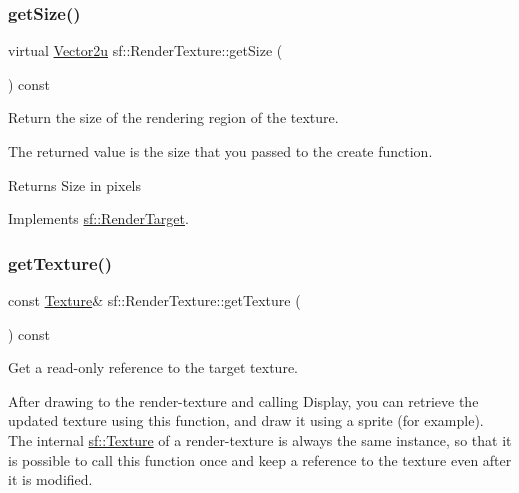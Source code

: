 \subsubsection{\texorpdfstring{getSize()}{getSize()}}
{\footnotesize\ttfamily virtual \mbox{\hyperlink{classsf_1_1_vector2}{Vector2u}} sf\+::\+Render\+Texture\+::get\+Size (\begin{DoxyParamCaption}{ }\end{DoxyParamCaption}) const\hspace{0.3cm}{\ttfamily [virtual]}}



Return the size of the rendering region of the texture. 

The returned value is the size that you passed to the create function.

\begin{DoxyReturn}{Returns}
Size in pixels \begin{DoxyVerb}\end{DoxyVerb}
 
\end{DoxyReturn}


Implements \mbox{\hyperlink{classsf_1_1_render_target_a2e5ade2457d9fb4c4907ae5b3d9e94a5}{sf\+::\+Render\+Target}}.

\mbox{\label{classsf_1_1_render_texture_a07ecea85f05932fa02a8279416721bc9}} 
\subsubsection{\texorpdfstring{getTexture()}{getTexture()}}
{\footnotesize\ttfamily const \mbox{\hyperlink{classsf_1_1_texture}{Texture}}\& sf\+::\+Render\+Texture\+::get\+Texture (\begin{DoxyParamCaption}{ }\end{DoxyParamCaption}) const}



Get a read-\/only reference to the target texture. 

After drawing to the render-\/texture and calling Display, you can retrieve the updated texture using this function, and draw it using a sprite (for example). The internal \mbox{\hyperlink{classsf_1_1_texture}{sf\+::\+Texture}} of a render-\/texture is always the same instance, so that it is possible to call this function once and keep a reference to the texture even after it is modified.

